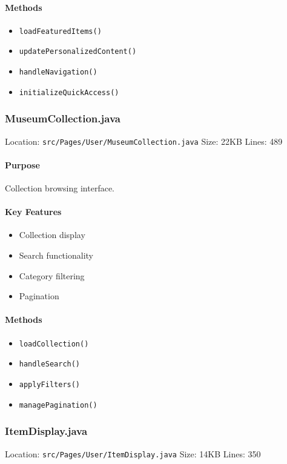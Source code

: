 \documentclass[12pt,a4paper]{article}
\begin{document}
\paragraph{Methods}
\begin{itemize}
    \item \texttt{loadFeaturedItems()}
    \item \texttt{updatePersonalizedContent()}
    \item \texttt{handleNavigation()}
    \item \texttt{initializeQuickAccess()}
\end{itemize}

\subsubsection{MuseumCollection.java}
Location: \texttt{src/Pages/User/MuseumCollection.java}
Size: 22KB
Lines: 489

\paragraph{Purpose}
Collection browsing interface.

\paragraph{Key Features}
\begin{itemize}
    \item Collection display
    \item Search functionality
    \item Category filtering
    \item Pagination
\end{itemize}

\paragraph{Methods}
\begin{itemize}
    \item \texttt{loadCollection()}
    \item \texttt{handleSearch()}
    \item \texttt{applyFilters()}
    \item \texttt{managePagination()}
\end{itemize}

\subsubsection{ItemDisplay.java}
Location: \texttt{src/Pages/User/ItemDisplay.java}
Size: 14KB
Lines: 350
\end{document}
